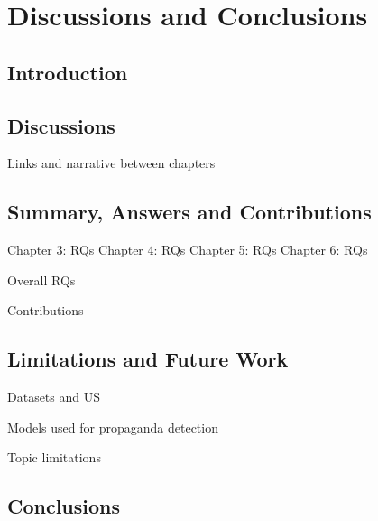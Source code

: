 \chapter{\statusred Discussions and Conclusions}
\label{chap:discussion}

\section{Introduction}

\section{Discussions}

Links and narrative between chapters

\section{Summary, Answers and Contributions}

Chapter 3: RQs
Chapter 4: RQs
Chapter 5: RQs
Chapter 6: RQs

Overall RQs


Contributions

\section{Limitations and Future Work}

Datasets and US

Models used for propaganda detection

Topic limitations

\section{Conclusions}